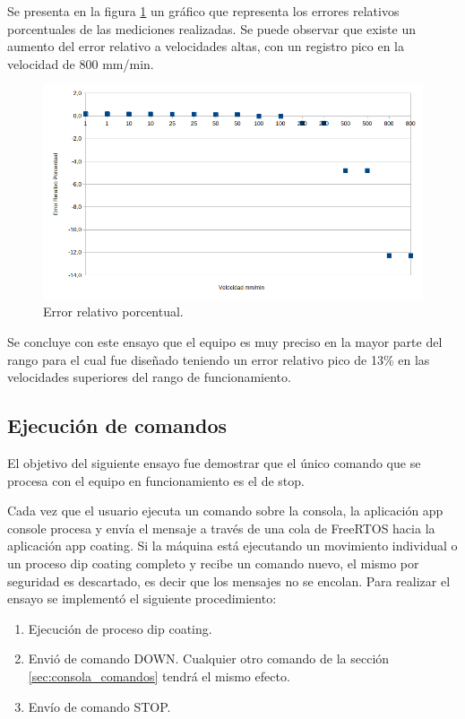 Se presenta en la figura \ref{fig:error_porcentual_1} un gráfico que representa los errores relativos porcentuales de las mediciones realizadas. Se puede observar que existe un aumento del error relativo a velocidades altas, con un registro pico  en la velocidad de 800 mm/min. 


\begin{figure}[h!]
\centering 
\includegraphics[width=1\textwidth]{./Figures/error.png}
\caption{Error relativo porcentual.}
\label{fig:error_porcentual_1}
\end{figure}
Se concluye con este ensayo que el equipo es muy preciso en la mayor parte del rango para el cual fue diseñado teniendo un error relativo pico de 13\% en las velocidades superiores del rango de funcionamiento.
 
 
\subsection{Ejecución de comandos}

El objetivo del siguiente ensayo fue demostrar que el único comando que se procesa con el equipo en funcionamiento es el de stop.

Cada vez que el usuario ejecuta un comando sobre la consola, la aplicación app console procesa y envía el mensaje a través de una cola de FreeRTOS hacia la aplicación app coating. Si la máquina está ejecutando un movimiento individual o un proceso dip coating completo y recibe un comando nuevo, el mismo por seguridad es descartado, es decir que los mensajes no se encolan. 
Para realizar el ensayo se implementó el siguiente procedimiento:
\begin{enumerate}
\item Ejecución de proceso  dip coating.
\item Envió de comando DOWN. Cualquier otro comando de la sección \ref{sec:consola_comandos} tendrá el mismo efecto.
\item Envío de comando STOP.
\end{enumerate}

